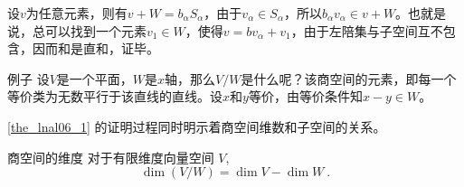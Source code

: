 设$v$为任意元素，则有$v + W=b_{\alpha} S_{\alpha}$，由于$v_{\alpha} \in S_{\alpha}$，所以$b_{\alpha} v_{\alpha} \in v + W$。也就是说，总可以找到一个元素$v_1 \in W$，使得$v=bv_{\alpha} + v_1$，由于左陪集与子空间互不包含，因而和是直和，证毕。
\begin{exercise}{例子}
设$V$是一个平面，$W$是$x$轴，那么$V/W$是什么呢？该商空间的元素，即每一个等价类为无数平行于该直线的直线。设$x$和$y$等价，由等价条件知$x-y \in W$。
\end{exercise}
\autoref{the_lnal06_1} 的证明过程同时明示着商空间维数和子空间的关系。

\begin{theorem}{商空间的维度}
对于有限维度向量空间 $V$,
\begin{equation}
\dim(V/W) = \dim V - \dim W~.
\end{equation}
\end{theorem}